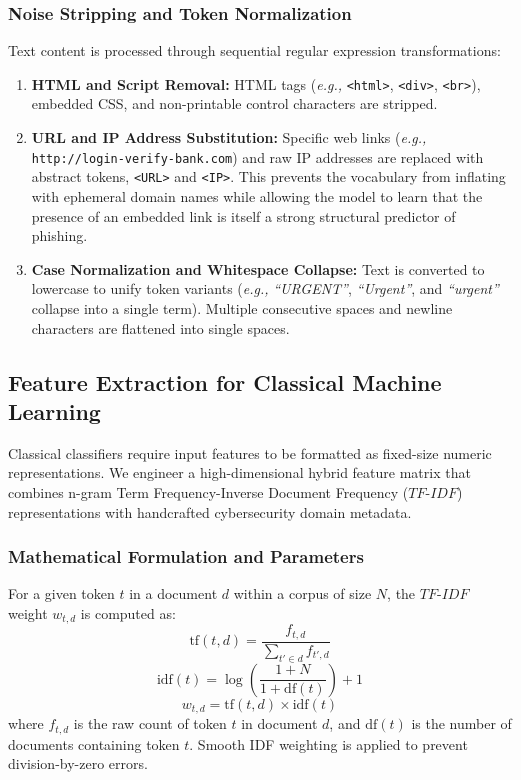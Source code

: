 \documentclass[conference]{IEEEtran}
\begin{document}
\subsubsection{Noise Stripping and Token Normalization}
Text content is processed through sequential regular expression transformations:
\begin{enumerate}
    \item \textbf{HTML and Script Removal:} HTML tags (\textit{e.g.,} \texttt{<html>}, \texttt{<div>}, \texttt{<br>}), embedded CSS, and non-printable control characters are stripped.
    \item \textbf{URL and IP Address Substitution:} Specific web links (\textit{e.g.,} \texttt{http://login-verify-bank.com}) and raw IP addresses are replaced with abstract tokens, \texttt{<URL>} and \texttt{<IP>}. This prevents the vocabulary from inflating with ephemeral domain names while allowing the model to learn that the presence of an embedded link is itself a strong structural predictor of phishing.
    \item \textbf{Case Normalization and Whitespace Collapse:} Text is converted to lowercase to unify token variants (\textit{e.g.,} \textit{``URGENT''}, \textit{``Urgent''}, and \textit{``urgent''} collapse into a single term). Multiple consecutive spaces and newline characters are flattened into single spaces.
\end{enumerate}

\subsection{Feature Extraction for Classical Machine Learning}
Classical classifiers require input features to be formatted as fixed-size numeric representations. We engineer a high-dimensional hybrid feature matrix that combines n-gram Term Frequency-Inverse Document Frequency ($TF\text{-}IDF$) representations with handcrafted cybersecurity domain metadata.
\subsubsection{Mathematical Formulation and Parameters}
For a given token $t$ in a document $d$ within a corpus of size $N$, the $TF\text{-}IDF$ weight $w_{t,d}$ is computed as:
\begin{equation}
\text{tf}(t,d) = \frac{f_{t,d}}{\sum_{t' \in d} f_{t',d}}
\end{equation}
\begin{equation}
\text{idf}(t) = \log\left(\frac{1 + N}{1 + \text{df}(t)}\right) + 1
\end{equation}
\begin{equation}
w_{t,d} = \text{tf}(t,d) \times \text{idf}(t)
\end{equation}
where $f_{t,d}$ is the raw count of token $t$ in document $d$, and $\text{df}(t)$ is the number of documents containing token $t$. Smooth IDF weighting is applied to prevent division-by-zero errors.
\end{document}
